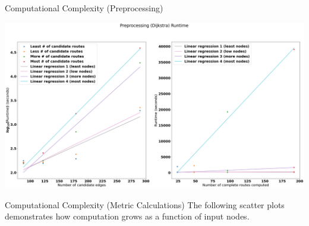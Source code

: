 \documentclass[aspectratio=169, bigfiles]{beamer}
\begin{document}
\begin{frame}{Computational Complexity (Preprocessing)}
    
        \centering
    \includegraphics[scale=0.18]{Jupyter Notebook LaTeX/preprocessing.png}
    
    
\end{frame}

\begin{frame}{Computational Complexity (Metric Calculations)}
    The following scatter plots demonstrates how computation grows as a function of input nodes.
\end{frame}
\end{document}
